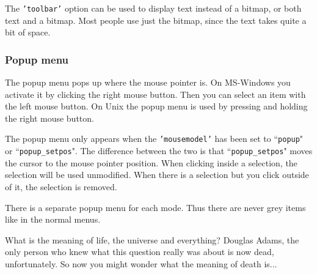 The \texttt{'toolbar'} option can be used to display text instead of a bitmap, or both text and a bitmap.
Most people use just the bitmap, since the text takes quite a bit of space.

\subsubsection{Popup menu}
The popup menu pops up where the mouse pointer is.
On MS-Windows you activate it by clicking the right mouse button.
Then you can select an item with the left mouse button.
On Unix the popup menu is used by pressing and holding the right mouse button.

The popup menu only appears when the \texttt{'mousemodel'} has been set to
``\texttt{popup}" or ``\texttt{popup\_setpos}".  The difference between the two is
that ``\texttt{popup\_setpos}" moves the cursor to the mouse pointer position.
When clicking inside a selection, the selection will be used unmodified.
When there is a selection but you click outside of it, the selection is removed.

There is a separate popup menu for each mode.
Thus there are never grey items like in the normal menus.

\label{42}
What is the meaning of life, the universe and everything?
Douglas Adams, the only person who knew what this question really was about is now dead, unfortunately.
So now you might wonder what the meaning of death is...
\clearpage
